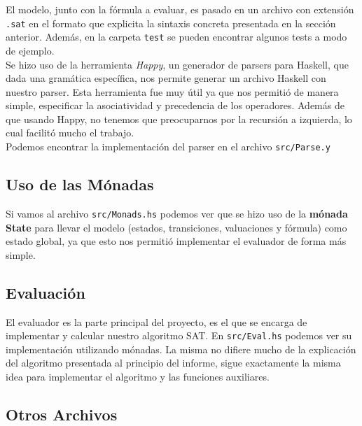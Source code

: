 \documentclass[11pt]{article}
\begin{document}
El modelo, junto con la fórmula a evaluar, es pasado en un archivo con
extensión \texttt{.sat} en el formato que explicita la sintaxis concreta
presentada en la sección anterior. Además, en la carpeta \texttt{test}
se pueden encontrar algunos tests a modo de ejemplo. \\

Se hizo uso de la herramienta \emph{Happy}, un generador de parsers
para Haskell, que dada una gramática específica, nos permite generar
un archivo Haskell con nuestro parser. Esta herramienta fue muy útil
ya que nos permitió de manera simple, especificar la asociatividad y
precedencia de los operadores. Además de que usando Happy, no 
tenemos que preocuparnos por la recursión a izquierda, lo cual
facilitó mucho el trabajo. \\

Podemos encontrar la implementación del parser en el archivo
\texttt{src/Parse.y}

\subsection{Uso de las Mónadas}

Si vamos al archivo \texttt{src/Monads.hs} podemos ver que se hizo
uso de la \textbf{mónada State} para llevar el modelo (estados,
transiciones, valuaciones y fórmula) como estado global, ya que esto
nos permitió implementar el evaluador de forma más simple.

\subsection{Evaluación}

El evaluador es la parte principal del proyecto, es el que se encarga
de implementar y calcular nuestro algoritmo SAT. En \texttt{src/Eval.hs}
podemos ver su implementación utilizando mónadas. La misma no difiere
mucho de la explicación del algoritmo presentada al principio del 
informe, sigue exactamente la misma idea para implementar el algoritmo
y las funciones auxiliares.

\subsection{Otros Archivos}
\end{document}
